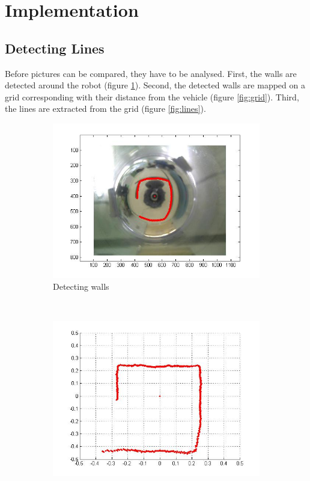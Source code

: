 \documentclass[12pt]{article}
\begin{document}
\clearpage

\section{Implementation}
\subsection{Detecting Lines}
Before pictures can be compared, they have to be analysed. First, the walls are detected around the robot (figure \ref{fig:points}). Second, the detected walls are mapped on a grid corresponding with their distance from the vehicle (figure \ref{fig:grid}). Third, the lines are extracted from the grid (figure \ref{fig:lines}).
\begin{figure}[h!]
	\centering
	\begin{subfigure}[b]{0.3\textwidth}
            \includegraphics[width=\textwidth]{points.jpg}
            \caption{Detecting walls}
            \label{fig:points}
    \end{subfigure}
    ~
    \begin{subfigure}[b]{0.3\textwidth}
            \includegraphics[width=\textwidth]{grid.jpg}

\end{subfigure}
\end{figure}
\end{document}
